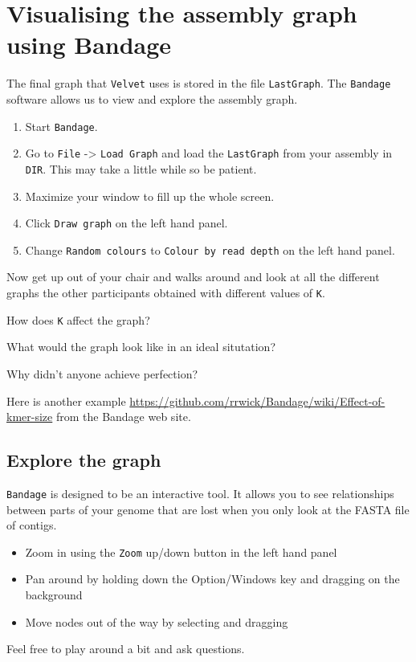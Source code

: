 \section{Visualising the assembly graph using Bandage}

The final graph that \texttt{Velvet} uses is stored in the file \texttt{LastGraph}. The \texttt{Bandage} software allows us to view and explore the assembly graph.
\begin{steps}
\begin{enumerate}
\item Start \texttt{Bandage}.
\item Go to \texttt{File} -> \texttt{Load Graph} and load the \texttt{LastGraph} from your assembly in \texttt{DIR}. This may take a little while so be patient.
\item Maximize your window to fill up the whole screen.
\item Click \texttt{Draw graph} on the left hand panel.
\item Change \texttt{Random colours} to \texttt{Colour by read depth} on the left hand panel.
\end{enumerate}
\end{steps}

Now get up out of your chair and walks around and look at all the different graphs the other participants obtained with different values of \texttt{K}.
\begin{questions}
How does \texttt{K} affect the graph?
\begin{answer}
\end{answer}
What would the graph look like in an ideal situtation?
\begin{answer}
\end{answer}
Why didn't anyone achieve perfection?
\begin{answer}
\end{answer}
\end{questions}

Here is another example \url{https://github.com/rrwick/Bandage/wiki/Effect-of-kmer-size} from the Bandage web site. %

\subsection{Explore the graph}

\texttt{Bandage} is designed to be an interactive tool. It allows you to see relationships between parts of your genome that are lost when you only look at the FASTA file of contigs.
\begin{itemize}
\item Zoom in using the \texttt{Zoom} up/down button in the left hand panel
\item Pan around by holding down the Option/Windows key and dragging on the background
\item Move nodes out of the way by selecting and dragging
\end{itemize}
Feel free to play around a bit and ask questions.

